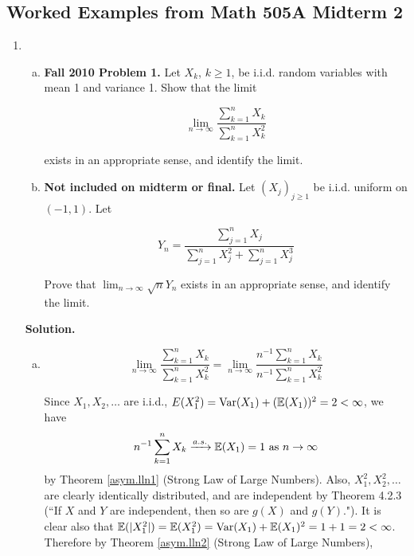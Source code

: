 \subsection{Worked Examples from Math 505A Midterm 2}

\begin{enumerate}[(1)]

\item



\begin{enumerate}[(a)]

\item  \textbf{Fall 2010 Problem 1.} Let \(X_k\), \(k \geq 1\), be i.i.d. random variables with mean 1 and variance 1. Show that the limit

\[
\lim_{n \to \infty} \frac{\sum_{k=1}^n X_k}{\sum_{k=1}^n X_k^2} 
\]

exists in an appropriate sense, and identify the limit.

\item \textbf{Not included on midterm or final.} Let \((X_j)_{j \geq 1}\) be i.i.d. uniform on \((-1, 1)\). Let 

\[
Y_n = \frac{\sum_{j=1}^n X_j}{\sum_{j=1}^n X_j^2 + \sum_{j=1}^n X_j^3} 
\]

Prove that \(\lim_{n \to \infty} \sqrt{n} Y_n\) exists in an appropriate sense, and identify the limit.

\end{enumerate}

\textbf{Solution.} \begin{enumerate}[(a)]

\item 


\[
\lim_{n \to \infty} \frac{\sum_{k=1}^n X_k}{\sum_{k=1}^n X_k^2} = \lim_{n \to \infty} \frac{n^{-1}\sum_{k=1}^n X_k}{n^{-1}\sum_{k=1}^n X_k^2}
\]

Since \(X_1, X_2, \ldots\) are i.i.d., \(E(X_1^2) = \mathrm{Var}(X_1) + (\mathbb{E}(X_1))^2 = 2 < \infty\), we have \[ n^{-1}\sum_{k=1}^n X_k \xrightarrow{a.s.} \mathbb{E}(X_1) = 1 \text{ as } n \to \infty\] by Theorem \ref{asym.lln1} (Strong Law of Large Numbers). Also, \(X_1^2, X_2^2, \ldots\) are clearly identically distributed, and are independent by Theorem 4.2.3 (``If \(X\) and \(Y\) are independent, then so are \(g(X)\) and \(g(Y)\)."). It is clear also that \(\mathbb{E}(|X_1^2|) = \mathbb{E}(X_1^2) = \mathrm{Var}(X_1) + \mathbb{E}(X_1)^2 = 1 + 1 = 2 < \infty\). Therefore by Theorem \ref{asym.lln2} (Strong Law of Large Numbers),  


\end{enumerate}
\end{enumerate}
